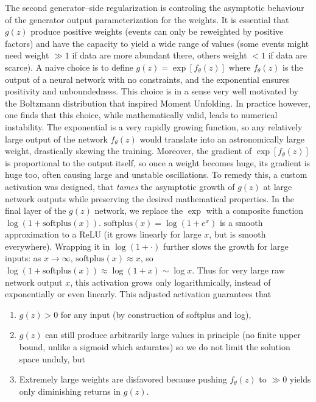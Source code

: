             The second generator--side regularization is controling the asymptotic behaviour of the {generator output parameterization} for the weights.
            It is essential that $g(z)$ produce positive weights (events can only be reweighted by positive factors) and have the capacity to yield a wide range of values (some events might need weight $\gg 1$ if data are more abundant there, others weight $<1$ if data are scarce). 
            A naive choice is to define $g(z) = \exp[f_\theta(z)]$ where $f_\theta(z)$ is the output of a neural network with no constraints, and the exponential ensures positivity and unboundedness.
            This choice is in a sense very well motivated by the Boltzmann distribution that inspired Moment Unfolding.
            In practice however, one finds that this choice, while mathematically valid, leads to numerical instability.
            The exponential is a very rapidly growing function, so any relatively large output of the network $f_\theta(z)$ would translate into an astronomically large weight, drastically skewing the training.
            Moreover, the gradient of $\exp[f_\theta(z)]$ is proportional to the output itself, so once a weight becomes huge, its gradient is huge too, often causing large and unstable oscillations.
            To remedy this, a custom activation was designed, that \emph{tames} the asymptotic growth of $g(z)$ at large network outputs while preserving the desired mathematical properties.
            In the final layer of the $g(z)$ network, we replace the $\exp$ with a composite function $\log(1 + \mathrm{softplus}(x))$.
            $\mathrm{softplus}(x) = \log(1+e^x)$ is a smooth approximation to a ReLU (it grows linearly for large $x$, but is smooth everywhere).
            Wrapping it in $\log(1+\cdot)$ further slows the growth for large inputs: as $x \to \infty$, $\mathrm{softplus}(x)\approx x$, so $\log(1+\mathrm{softplus}(x)) \approx \log(1+x) \sim \log x$.
            Thus for very large raw network output $x$, this activation grows only logarithmically, instead of exponentially or even linearly.
            This adjusted activation guarantees that
            \begin{enumerate}
                \item $g(z) > 0$ for any input (by construction of softplus and log),
                \item \(g(z)\) can still produce arbitrarily large values in principle (no finite upper bound, unlike a sigmoid which saturates) so we do not limit the solution space unduly, but
                \item Extremely large weights are disfavored because pushing $f_\theta(z)$ to $\gg 0$ yields only diminishing returns in $g(z)$.
            \end{enumerate}
